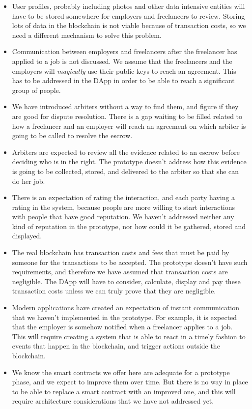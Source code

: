 \documentclass{article}
\begin{document}
\begin{itemize}
  \item User profiles, probably including photos and other data intensive entities will have to be stored somewhere for employers and freelancers to review. Storing lots of data in the blockchain is not viable because of transaction costs, so we need a different mechanism to solve this problem.
  \item Communication between employers and freelancers after the freelancer has applied to a job is not discussed. We assume that the freelancers and the employers will \emph{magically} use their public keys to reach an agreement. This has to be addressed in the DApp in order to be able to reach a significant group of people.
  \item We have introduced arbiters without a way to find them, and figure if they are good for dispute resolution. There is a gap waiting to be filled related to how a freelancer and an employer will reach an agreement on which arbiter is going to be called to resolve the escrow.
  \item Arbiters are expected to review all the evidence related to an escrow before deciding who is in the right. The prototype doesn't address how this evidence is going to be collected, stored, and delivered to the arbiter so that she can do her job.
  \item There is an expectation of rating the interaction, and each party having a rating in the system, because people are more willing to start interactions with people that have good reputation. We haven't addressed neither any kind of reputation in the prototype, nor how could it be gathered, stored and displayed.
  \item The real blockchain has transaction costs and fees that must be paid by someone for the transactions to be accepted. The prototype doesn't have such requirements, and therefore we have assumed that transaction costs are negligible. The DApp will have to consider, calculate, display and pay these transaction costs unless we can truly prove that they are negligible.
  \item Modern applications have created an expectation of instant communication that we haven't implemented in the prototype. For example, it is expected that the employer is somehow notified when a freelancer applies to a job. This will require creating a system that is able to react in a timely fashion to events that happen in the blockchain, and trigger actions outside the blockchain.
  \item We know the smart contracts we offer here are adequate for a prototype phase, and we expect to improve them over time. But there is no way in place to be able to replace a smart contract with an improved one, and this will require architecture considerations that we have not addressed yet.

\end{itemize}
\end{document}
